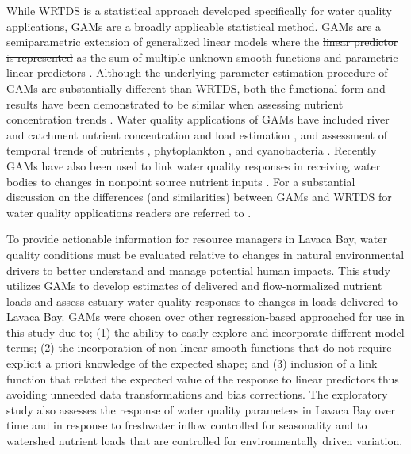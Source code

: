 \documentclass[fleqn,10pt,lineno]{wlpeerj} %
\providecommand{\DIFaddtex}[1]{{\protect\color{blue}\uwave{#1}}} %
\providecommand{\DIFdeltex}[1]{{\protect\color{red}\sout{#1}}}                      %
\providecommand{\DIFaddbegin}{} %
\providecommand{\DIFaddend}{} %
\providecommand{\DIFdelbegin}{} %
\providecommand{\DIFdelend}{} %
\providecommand{\DIFadd}[1]{\texorpdfstring{\DIFaddtex{#1}}{#1}} %
\providecommand{\DIFdel}[1]{\texorpdfstring{\DIFdeltex{#1}}{}} %
\begin{document}
While WRTDS is a statistical approach developed specifically for water
quality applications, GAMs are a broadly applicable statistical method.
GAMs are a semiparametric extension of generalized linear models where
the \DIFdelbegin \DIFdel{linear predictor is represented }\DIFdelend \DIFaddbegin \DIFadd{response variable is modeled }\DIFaddend as the sum of multiple unknown smooth
functions and parametric linear predictors
\autocite{woodFastStableRestricted2011}. Although the underlying
parameter estimation procedure of GAMs are substantially different than
WRTDS, both the functional form and results have been demonstrated to be
similar when assessing nutrient concentration trends
\autocite{beckNumericalQualitativeContrasts2017}. Water quality
applications of GAMs have included river and catchment nutrient
concentration and load estimation
\autocite{wangLoadEstimationUncertainties2011,kroonRiverLoadsSuspended2012,kuhnertQuantifyingTotalSuspended2012,robson_prediction_2015-1,hagemannEstimatingNutrientOrganic2016,mcdowell_implications_2021,biagi_novel_2022},
and assessment of temporal trends of nutrients
\autocite{beckNumericalQualitativeContrasts2017,murphyGeneralizedAdditiveModel2019},
phytoplankton \autocite{bergbuschUnexpectedShiftPhytoplankton2021}, and
cyanobacteria \autocite{hayesEffectsLakeWarming2020}. Recently GAMs have
also been used to link water quality responses in receiving water bodies
to changes in nonpoint source nutrient inputs
\autocite{murphyNutrientImprovementsChesapeake2022}. For a substantial
discussion on the differences (and similarities) between GAMs and WRTDS
for water quality applications readers are referred to
\textcite{beckNumericalQualitativeContrasts2017}.

To provide actionable information for resource managers in Lavaca Bay,
water quality conditions must be evaluated relative to changes in
natural environmental drivers to better understand and manage potential
human impacts. This study utilizes GAMs to develop estimates of
delivered and flow-normalized nutrient loads and assess estuary water
quality responses to changes in loads delivered to Lavaca Bay. GAMs were
chosen over other regression-based approached for use in this study due
to; (1) the ability to easily explore and incorporate different model
terms; (2) the incorporation of non-linear smooth functions that do not
require explicit a priori knowledge of the expected shape; and (3)
inclusion of a link function that related the expected value of the
response to linear predictors thus avoiding unneeded data
transformations and bias corrections. The exploratory study also
assesses the response of water quality parameters in Lavaca Bay over
time and in response to freshwater inflow controlled for seasonality and
to watershed nutrient loads that are controlled for environmentally
driven variation.
\end{document}
